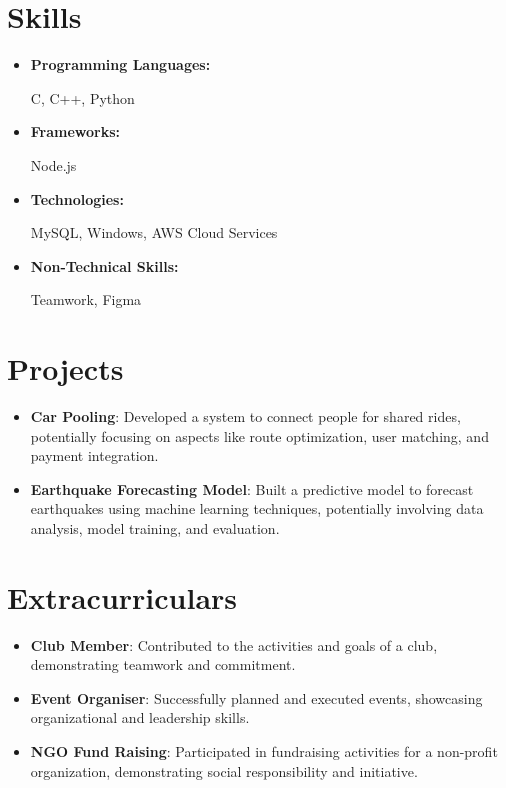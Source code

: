\documentclass[a4paper, 12pt]{article}
\begin{document}
\section*{Skills}
\begin{itemize}
    
    \item \textbf{Programming Languages:}
   
         C,  C++,  Python
 
    

    
    \item \textbf{Frameworks:}
    
        Node.js
  
    

    
    \item \textbf{Technologies:}
    
         MySQL,  Windows,  AWS Cloud Services
  
    

    
    \item \textbf{Non-Technical Skills:}
   
         Teamwork,  Figma
   
    
\end{itemize}

\section*{Projects}
\begin{itemize}
    \item \textbf{Car Pooling}: Developed a system to connect people for shared rides, potentially focusing on aspects like route optimization, user matching, and payment integration.
\item \textbf{Earthquake Forecasting Model}: Built a predictive model to forecast earthquakes using machine learning techniques, potentially involving data analysis, model training, and evaluation.
\end{itemize}


\section*{Extracurriculars}
\begin{itemize}
    \item \textbf{Club Member}: Contributed to the activities and goals of a club, demonstrating teamwork and commitment.
\item \textbf{Event Organiser}: Successfully planned and executed events, showcasing organizational and leadership skills.
\item \textbf{NGO Fund Raising}: Participated in fundraising activities for a non-profit organization, demonstrating social responsibility and initiative.
\end{itemize}
\end{document}

